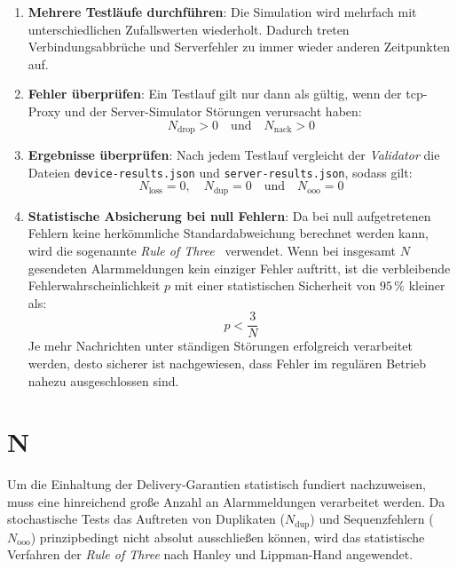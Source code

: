 \begin{enumerate}
    \item \textbf{Mehrere Testläufe durchführen}: Die Simulation wird mehrfach mit unterschiedlichen Zufallswerten wiederholt. Dadurch treten Verbindungsabbrüche und Serverfehler zu immer wieder anderen Zeitpunkten auf.
    \item \textbf{Fehler überprüfen}: Ein Testlauf gilt nur dann als gültig, wenn der \gls{tcp}-Proxy und der Server-Simulator Störungen verursacht haben:
          \begin{equation}
              N_{\text{drop}} > 0 \quad \text{und} \quad N_{\text{nack}} > 0
          \end{equation}
    \item \textbf{Ergebnisse überprüfen}: Nach jedem Testlauf vergleicht der \textit{Validator} die Dateien \texttt{device-results.json} und \texttt{server-results.json}, sodass gilt:
          \begin{equation}
              N_{\text{loss}} = 0, \quad N_{\text{dup}} = 0 \quad \text{und} \quad N_{\text{ooo}} = 0
          \end{equation}
    \item \textbf{Statistische Absicherung bei null Fehlern}: Da bei null aufgetretenen Fehlern keine herkömmliche Standardabweichung berechnet werden kann, wird die sogenannte \textit{Rule of Three}~\citep{hanley1983} verwendet. Wenn bei insgesamt $N$ gesendeten Alarmmeldungen kein einziger Fehler auftritt, ist die verbleibende Fehlerwahrscheinlichkeit $p$ mit einer statistischen Sicherheit von $95\,\%$ kleiner als:
          \begin{equation}
              p < \frac{3}{N}
          \end{equation}
          Je mehr Nachrichten unter ständigen Störungen erfolgreich verarbeitet werden, desto sicherer ist nachgewiesen, dass Fehler im regulären Betrieb nahezu ausgeschlossen sind.
\end{enumerate}

\chapter{N}

Um die Einhaltung der Delivery-Garantien statistisch fundiert nachzuweisen, muss eine hinreichend große Anzahl an Alarmmeldungen verarbeitet werden. Da stochastische Tests das Auftreten von Duplikaten ($N_{\text{dup}}$) und Sequenzfehlern ($N_{\text{ooo}}$) prinzipbedingt nicht absolut ausschließen können, wird das statistische Verfahren der \textit{Rule of Three} nach Hanley und Lippman-Hand angewendet.

